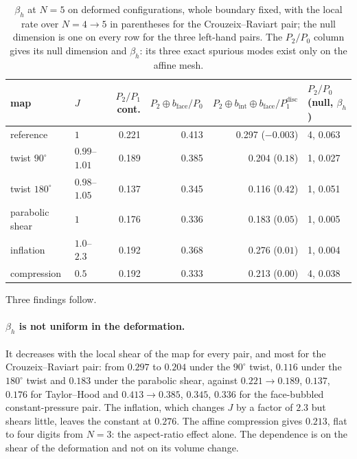 \documentclass{article}
\theoremstyle{definition}
\theoremstyle{plain}
\begin{document}
\begin{table}[tbp]
\centering
\caption{$\beta_h$ at $N = 5$ on deformed configurations, whole boundary
fixed, with the local rate over $N = 4 \to 5$ in parentheses for the
Crouzeix--Raviart pair; the null dimension is one on every row for the three
left-hand pairs. The $P_2/P_0$ column gives its null dimension and
$\beta_h$: its three exact spurious modes exist only on the affine mesh.}
\label{tab:deformed}
\begin{tabular}{@{}llrrrl@{}}
\toprule
map & $J$ & $P_2/P_1$ cont. & $P_2 \oplus b_{\mathrm{face}}/P_0$
    & $P_2 \oplus b_{\mathrm{int}} \oplus b_{\mathrm{face}}/P_1^{\mathrm{disc}}$
    & $P_2/P_0$ (null, $\beta_h$) \\
\midrule
reference          & $1$          & 0.221 & 0.413 & 0.297 ($-0.003$) & 4, 0.063 \\
twist $90^\circ$   & $0.99$--$1.01$ & 0.189 & 0.385 & 0.204 ($0.18$)  & 1, 0.027 \\
twist $180^\circ$  & $0.98$--$1.05$ & 0.137 & 0.345 & 0.116 ($0.42$)  & 1, 0.051 \\
parabolic shear    & $1$          & 0.176 & 0.336 & 0.183 ($0.05$)   & 1, 0.005 \\
inflation          & $1.0$--$2.3$   & 0.192 & 0.368 & 0.276 ($0.01$)   & 1, 0.004 \\
compression        & $0.5$        & 0.192 & 0.333 & 0.213 ($0.00$)   & 4, 0.038 \\
\bottomrule
\end{tabular}
\end{table}

Three findings follow.

\paragraph{$\beta_h$ is not uniform in the deformation.} It decreases with
the local shear of the map for every pair, and most for the
Crouzeix--Raviart pair: from $0.297$ to $0.204$ under the $90^\circ$ twist,
$0.116$ under the $180^\circ$ twist and $0.183$ under the parabolic shear,
against $0.221 \to 0.189$, $0.137$, $0.176$ for Taylor--Hood and
$0.413 \to 0.385$, $0.345$, $0.336$ for the face-bubbled constant-pressure
pair. The inflation, which changes $J$ by a factor of $2.3$ but shears
little, leaves the constant at $0.276$. The affine compression gives $0.213$,
flat to four digits from $N = 3$: the aspect-ratio effect alone.
The dependence is on the shear of the deformation and not on its volume
change.
\end{document}
